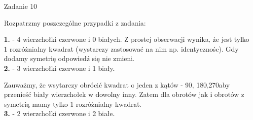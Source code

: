 \documentclass[a4paper]{article}
\begin{document}
\begin{center}
{\fontsize{20}{20}\selectfont Zadanie 10}
\end{center}
Rozpatrzmy poszczególne przypadki z zadania:\\
\begin{adjustwidth}{30pt}{30pt}
\textbf{1.} - 4 wierzchołki czerwone i 0 białych. Z prostej obserwacji wynika, że jest tylko 1 rozróżnialny kwadrat (wystarczy zastosować na nim np. identycznośc). Gdy dodamy symetrię odpowiedź się nie zmieni.\\
\textbf{2.} - 3 wierzchołki czerwone i 1 biały.\\
\begin{center}
\end{center}
Zauważmy, że wsytarczy obrócić kwadrat o jeden z kątów - 90\textdegree, 180\textdegree ,270\textdegree aby przenieść biały wierzchołek w dowolny inny. Zatem dla obrotów jak i obrotów z symetrią mamy tylko 1 rozróżnialny kwadrat.\\
\textbf{3.} - 2 wierzchołki czerwone i 2 białe.\\
\begin{center}
\end{center}
\end{adjustwidth}
\end{document}
